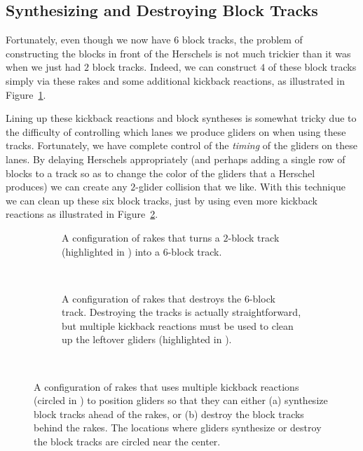 \subsection{Synthesizing and Destroying Block Tracks}\label{sec:silverfish_synth_destroy_blocks}

Fortunately, even though we now have $6$ block tracks, the problem of constructing the blocks in front of the Herschels is not much trickier than it was when we just had $2$ block tracks. Indeed, we can construct $4$ of these block tracks simply via these rakes and some additional kickback reactions, as illustrated in Figure~\ref{fig:31c_240_track_builder}.

Lining up these kickback reactions and block syntheses is somewhat tricky due to the difficulty of controlling which lanes we produce gliders on when using these tracks. Fortunately, we have complete control of the \emph{timing} of the gliders on these lanes. By delaying Herschels appropriately (and perhaps adding a single row of blocks to a track so as to change the color of the gliders that a Herschel produces) we can create any $2$-glider collision that we like. With this technique we can clean up these six block tracks, just by using even more kickback reactions as illustrated in Figure~\ref{fig:31c_240_track_destroyer}.

\begin{figure}[!htbp]
	\centering
	\begin{subfigure}{\textwidth}
		\centering
		\caption{A configuration of rakes that turns a $2$-block track (highlighted in ) into a $6$-block track.}\label{fig:31c_240_track_builder}
	\end{subfigure} \\[0.2cm]
	\begin{subfigure}{\textwidth}
		\centering
		\caption{A configuration of rakes that destroys the $6$-block track. Destroying the tracks is actually straightforward, but multiple kickback reactions must be used to clean up the leftover gliders (highlighted in ).}\label{fig:31c_240_track_destroyer}
	\end{subfigure} \\
	\caption{A configuration of rakes that uses multiple kickback reactions (circled in ) to position gliders so that they can either (a) synthesize block tracks ahead of the rakes, or (b) destroy the block tracks behind the rakes. The locations where gliders synthesize or destroy the block tracks are circled near the center.}\label{fig:31c_240_builder_destroyer}
\end{figure}

